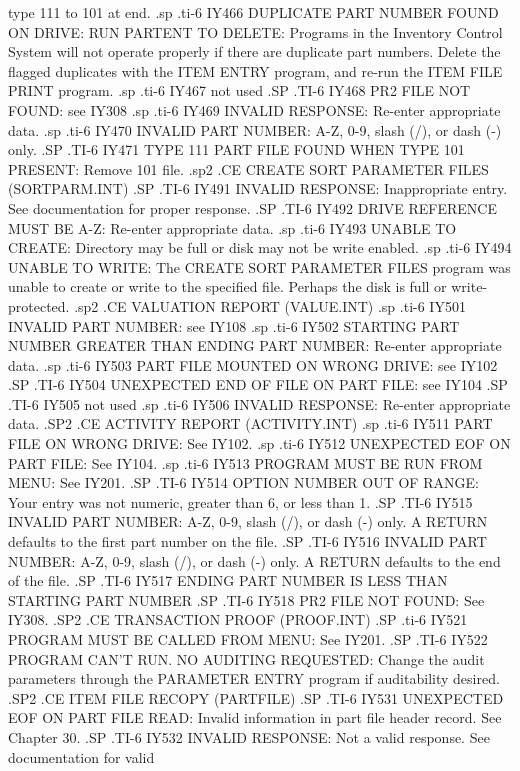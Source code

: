 type 111 to 101 at end.
.sp
.ti-6
IY466 DUPLICATE PART NUMBER FOUND ON DRIVE: RUN PARTENT TO DELETE: Programs
in the Inventory Control System will not operate properly if there are
duplicate part numbers.  Delete the flagged duplicates with the ITEM ENTRY
program, and
re-run the ITEM FILE PRINT program.
.sp
.ti-6
IY467 not used
.SP
.TI-6
IY468 PR2 FILE NOT FOUND: see IY308
.sp
.ti-6
IY469 INVALID RESPONSE: Re-enter appropriate data.
.sp
.ti-6
IY470 INVALID PART NUMBER: A-Z, 0-9, slash (/), or dash (-) only.
.SP
.TI-6
IY471 TYPE 111 PART FILE FOUND WHEN TYPE 101 PRESENT: Remove 101 file.
.sp2
.CE
CREATE SORT PARAMETER FILES (SORTPARM.INT)
.SP
.TI-6
IY491 INVALID RESPONSE: Inappropriate entry.   See documentation for proper
response.
.SP
.TI-6
IY492 DRIVE REFERENCE MUST BE A-Z: Re-enter appropriate data.
.sp
.ti-6
IY493 UNABLE TO CREATE: Directory may be full or disk may not be write
enabled.
.sp
.ti-6
IY494 UNABLE TO WRITE: The CREATE SORT PARAMETER FILES program
was unable to create or write to the
specified file.  Perhaps the disk is full or write-protected.
.sp2
.CE
VALUATION REPORT (VALUE.INT)
.sp
.ti-6
IY501 INVALID PART NUMBER: see IY108
.sp
.ti-6
IY502 STARTING PART NUMBER GREATER THAN ENDING PART NUMBER: Re-enter
appropriate data.
.sp
.ti-6
IY503 PART FILE MOUNTED ON WRONG DRIVE: see IY102
.SP
.TI-6
IY504 UNEXPECTED END OF FILE ON PART FILE: see IY104
.SP
.TI-6
IY505 not used
.sp
.ti-6
IY506 INVALID RESPONSE: Re-enter appropriate data.
.SP2
.CE
ACTIVITY REPORT (ACTIVITY.INT)
.sp
.ti-6
IY511 PART FILE ON WRONG DRIVE: See IY102.
.sp
.ti-6
IY512 UNEXPECTED EOF ON PART FILE: See IY104.
.sp
.ti-6
IY513 PROGRAM MUST BE RUN FROM MENU: See IY201.
.SP
.TI-6
IY514 OPTION NUMBER OUT OF RANGE: Your entry was not numeric, greater than
6, or less than 1.
.SP
.TI-6
IY515 INVALID PART NUMBER: A-Z, 0-9, slash (/), or dash (-) only. A RETURN
defaults to the first part number on the file.
.SP
.TI-6
IY516 INVALID PART NUMBER: A-Z, 0-9, slash (/), or dash (-) only. A RETURN
defaults to the end of the file.
.SP
.TI-6
IY517 ENDING PART NUMBER IS LESS THAN STARTING PART NUMBER
.SP
.TI-6
IY518 PR2 FILE NOT FOUND: See IY308.
.SP2
.CE
TRANSACTION PROOF (PROOF.INT)
.SP
.ti-6
IY521 PROGRAM MUST BE CALLED FROM MENU: See IY201.
.SP
.TI-6
IY522 PROGRAM CAN'T RUN. NO AUDITING REQUESTED: Change the audit parameters
through the PARAMETER ENTRY program if auditability desired.
.SP2
.CE
ITEM FILE RECOPY (PARTFILE)
.SP
.TI-6
IY531 UNEXPECTED EOF ON PART FILE READ: Invalid information in part file
header record. See Chapter 30.
.SP
.TI-6
IY532 INVALID RESPONSE: Not a valid response.  See documentation for valid
